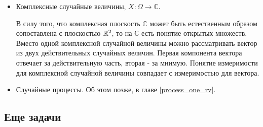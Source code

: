{\begin{itemize}
\item Комплексные случайные величины, $X:\Omega\to\mathbb{C}$.

В силу того, что комплексная плоскость $\mathbb{C}$ может быть естественным образом сопоставлена с плоскостью $\mathbb R^{2}$, то на $\mathbb{C}$ есть понятие открытых множеств. Вместо одной комплексной случайной величины можно рассматривать вектор из двух действительных случайных величин. Первая компонента вектора отвечает за действительную часть, вторая - за мнимую. Понятие измеримости для комплексной случайной величины совпадает с измеримостью для вектора.

\item Случайные процессы. Об этом позже, в главе \ref{process_one_rv}.

\end{itemize}

}\subsection{Еще задачи}




